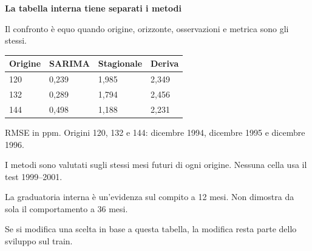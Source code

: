 \documentclass[12pt,aspectratio=1610]{beamer}
\newcommand{\PBody}[1]{\par{\fontsize{11.3}{14.8}\selectfont #1\par}}
\newcommand{\PSmall}[1]{\par{\fontsize{9.8}{13.1}\selectfont #1\par}}
\newcommand{\PInfo}[1]{%
\begin{tcolorbox}[enhanced,arc=1.6mm,boxrule=.55pt,colback=GeoTint,
 colframe=Rule!80!Classical,left=2.3mm,right=2.3mm,top=2mm,bottom=2mm,
 before skip=1mm,after skip=1mm]
\PSmall{#1}\end{tcolorbox}}
\begin{document}
\begin{frame}[plain]\hypertarget{slide76}{}
\begin{lrbox}{\TitleBox}
\begin{minipage}[t]{17.7cm}\raggedright\color{Ink}\fontsize{11.3}{14.8}\selectfont
\color{Navy}\bfseries\fontsize{20.6}{24.5}\selectfont La tabella interna tiene separati i metodi
\end{minipage}\end{lrbox}

\begin{lrbox}{\RecallBox}
\begin{minipage}[t]{14.3cm}\raggedright\color{Ink}\fontsize{11.3}{14.8}\selectfont
\fontsize{10.3}{13.8}\selectfont Il confronto è equo quando origine, orizzonte, osservazioni e metrica sono gli stessi.
\end{minipage}\end{lrbox}

\begin{lrbox}{\PilotLeftBox}
\begin{minipage}[t]{10.05cm}\raggedright\color{Ink}\fontsize{11.3}{14.8}\selectfont
{\fontsize{10.2}{13.1}\selectfont\renewcommand{\arraystretch}{1.45}\begin{tabular}{@{}p{2.0835cm}p{2.0835cm}p{2.0835cm}p{2.0835cm}@{}}\toprule
\textbf{Origine} & \textbf{SARIMA} & \textbf{Stagionale} & \textbf{Deriva}\\\midrule
120 & 0,239 & 1,985 & 2,349\\
132 & 0,289 & 1,794 & 2,456\\
144 & 0,498 & 1,188 & 2,231\\
\bottomrule\end{tabular}}
\PSmall{RMSE in ppm. Origini 120, 132 e 144: dicembre 1994, dicembre 1995 e dicembre 1996.}

\end{minipage}\end{lrbox}

\begin{lrbox}{\PilotRightBox}
\begin{minipage}[t]{7.55cm}\raggedright\color{Ink}\fontsize{11.3}{14.8}\selectfont
\PBody{I metodi sono valutati sugli stessi mesi futuri di ogni origine. Nessuna cella usa il test 1999--2001.}
\vspace{2.5mm}
\PInfo{La graduatoria interna è un’evidenza sul compito a 12 mesi. Non dimostra da sola il comportamento a 36 mesi.}
\PBody{Se si modifica una scelta in base a questa tabella, la modifica resta parte dello sviluppo sul train.}
\vspace{2.5mm}


\end{minipage}
\end{lrbox}
\end{frame}
\end{document}
